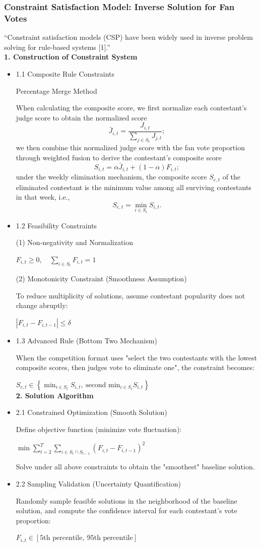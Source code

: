 \documentclass{mcmthesis}
\begin{document}
\subsubsection{Constraint Satisfaction Model: Inverse Solution for Fan Votes}
“Constraint satisfaction models (CSP) have been widely used in inverse problem solving for rule-based systems [1].”\hfill\\


\noindent\textbf{1. Construction of Constraint System}
\begin{itemize}
\item 1.1 Composite Rule Constraints

Percentage Merge Method

When calculating the composite score, we first normalize each contestant's judge score to obtain the normalized score 
\[
\bar{J}_{i,t} = \frac{J_{i,t}}{\sum_{j \in S_t} J_{j,t}};
\]
we then combine this normalized judge score with the fan vote proportion through weighted fusion to derive the contestant's composite score 
\[
S_{i,t} = \alpha \bar{J}_{i,t} + (1-\alpha) F_{i,t};
\]
under the weekly elimination mechanism, the composite score \(S_{e,t}\) of the eliminated contestant is the minimum value among all surviving contestants in that week, i.e., 
\[
S_{e,t} = \min_{i \in S_t} S_{i,t}.
\]
\item 1.2 Feasibility Constraints

(1) Non-negativity and Normalization

$F_{i,t} \ge 0,\quad \sum_{i \in S_t} F_{i,t} = 1$

(2) Monotonicity Constraint (Smoothness Assumption)

To reduce multiplicity of solutions, assume contestant popularity does not change abruptly:

$|F_{i,t} - F_{i,t-1}| \le \delta$

\item 1.3 Advanced Rule (Bottom Two Mechanism)

When the competition format uses "select the two contestants with the lowest composite scores, then judges vote to eliminate one", the constraint becomes:

$S_{e,t} \in \left\{ \min_{i \in S_t} S_{i,t},\ \text{second min}_{i \in S_t} S_{i,t} \right\}$\hfill\\


\noindent\textbf{2. Solution Algorithm}
\item 2.1 Constrained Optimization (Smooth Solution)

Define objective function (minimize vote fluctuation):

$\min \sum_{t=2}^T \sum_{i \in S_t \cap S_{t-1}} (F_{i,t} - F_{i,t-1})^2$

Solve under all above constraints to obtain the "smoothest" baseline solution.

\item 2.2 Sampling Validation (Uncertainty Quantification)

Randomly sample feasible solutions in the neighborhood of the baseline solution, and compute the confidence interval for each contestant's vote proportion:

$F_{i,t} \in [\text{5th percentile},\ \text{95th percentile}]$
\end{itemize}
\end{document}
